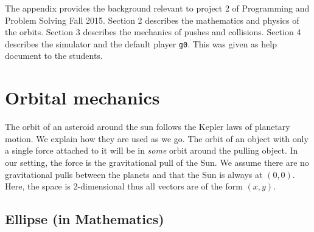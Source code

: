\begin{appendices}
The appendix provides the background relevant to project 2 of Programming and 
Problem Solving Fall 2015. Section 2 describes the mathematics and physics of the 
orbits. Section 3 describes the mechanics of pushes and collisions. Section 4 
describes the simulator and the default player \verb#g0#. This was given as 
help document to the students.
\section{Orbital mechanics}

The orbit of an asteroid around the sun follows the Kepler laws of planetary motion. We explain how they are used as we go. The orbit of an object with only a single force attached to it will be in \emph{some} orbit around the pulling object. In our setting, the force is the gravitational pull of the Sun. We assume there are no gravitational pulls between the planets and that the Sun is always at $(0,0)$. Here, the space is 2-dimensional thus all vectors are of the form $(x,y)$.


\subsection{Ellipse (in Mathematics)}


\end{appendices}
